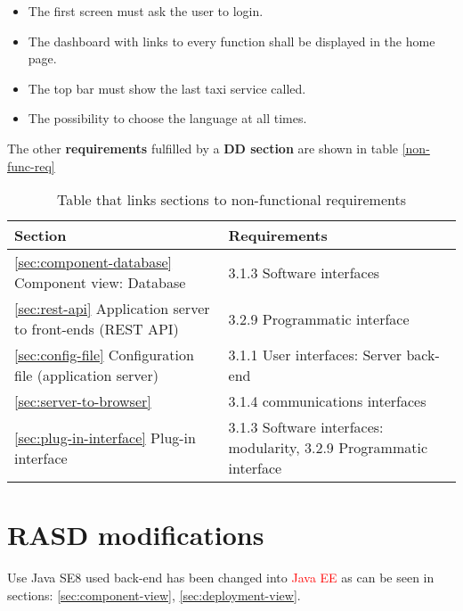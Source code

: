 \begin{itemize}
\item The first screen must ask the user to login.
\item The dashboard with links to every function shall be displayed in the home page.
\item The top bar must show the last taxi service called.
\item The possibility to choose the language at all times.
\end{itemize}

The other {\bf requirements} fulfilled by a {\bf DD section} are shown in table \autoref{non-func-req}




\begin{table}[h]
\begin{center}
\begin{tabular}{|p{}|p{}|}
\hline
{\bf Section}  & {\bf Requirements}\\
\hline
\autoref{sec:component-database} Component view: Database & 
3.1.3 Software interfaces\\
\hline
\autoref{sec:rest-api} Application server to front-ends (REST API) & 3.2.9 Programmatic interface \\
\hline
\autoref{sec:config-file} Configuration file (application server) & 3.1.1 User interfaces: Server back-end \\
\hline
\autoref{sec:server-to-browser} & 3.1.4 communications interfaces \\
\hline
\autoref{sec:plug-in-interface} Plug-in interface & 3.1.3 Software interfaces: modularity, 3.2.9 Programmatic interface \\
\hline
\end{tabular}
\caption{Table that links sections to non-functional requirements}
\label{non-func-req}
\end{center}
\end{table}

\section{RASD modifications}
\label{RASD-changes}

Use Java SE8 used back-end has been changed into \textcolor{red}{Java EE} as can be seen in sections: \ref{sec:component-view}, \ref{sec:deployment-view}.






